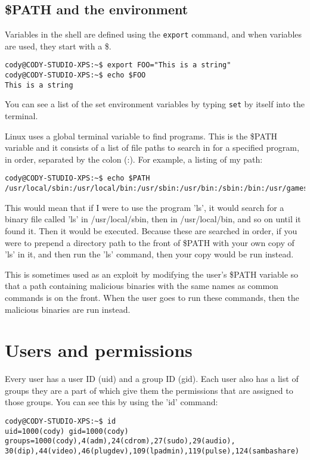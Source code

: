 \documentclass{article}
\begin{document}
\subsection{\$PATH and the environment}
Variables in the shell are defined using the \texttt{export} command, and when variables are used, they start with a \$.
\begin{verbatim}
cody@CODY-STUDIO-XPS:~$ export FOO="This is a string"
cody@CODY-STUDIO-XPS:~$ echo $FOO
This is a string
\end{verbatim} 
You can see a list of the set environment variables by typing \texttt{set} by itself into the terminal.

Linux uses a global terminal variable to find programs. This is the \$PATH variable and it consists of a list of file paths to search in for a specified program, in order, separated by the colon (:). For example, a listing of my path:
\begin{verbatim}
cody@CODY-STUDIO-XPS:~$ echo $PATH
/usr/local/sbin:/usr/local/bin:/usr/sbin:/usr/bin:/sbin:/bin:/usr/games
\end{verbatim}
This would mean that if I were to use the program 'ls', it would search for a binary file called 'ls' in /usr/local/sbin, then in /usr/local/bin, and so on until it found it. Then it would be executed. Because these are searched in order, if you were to prepend a directory path to the front of \$PATH with your own copy of 'ls' in it, and then run the 'ls' command, then your copy would be run instead.

This is sometimes used as an exploit by modifying the user's \$PATH variable so that a path containing malicious binaries with the same names as common commands is on the front. When the user goes to run these commands, then the malicious binaries are run instead.

\section{Users and permissions}
Every user has a user ID (uid) and a group ID (gid). Each user also has a list of groups they are a part of which give them the permissions that are assigned to those groups. You can see this by using the 'id' command:
\begin{verbatim}
cody@CODY-STUDIO-XPS:~$ id
uid=1000(cody) gid=1000(cody) groups=1000(cody),4(adm),24(cdrom),27(sudo),29(audio),
30(dip),44(video),46(plugdev),109(lpadmin),119(pulse),124(sambashare)
\end{verbatim}
\end{document}
